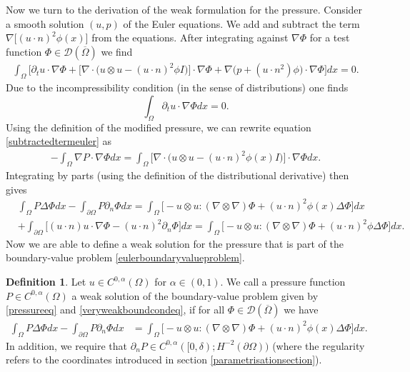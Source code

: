 \documentclass[12pt,a4paper]{article}
\theoremstyle{definition}
\newtheorem{definition}[theorem]{Definition}
\theoremstyle{remark}
\numberwithin{equation}{section}
\begin{document}
Now we turn to the derivation of the weak formulation for the pressure. Consider a smooth solution $(u,p)$ of the Euler equations. We add and subtract the term $\nabla \big[ (u \cdot n)^2 \phi (x) \big]$ from the equations. After integrating against $\nabla \Phi$ for a test function $\Phi \in \mathcal{D} (\overline{\Omega})$ we find
\begin{align} \label{subtractedtermeuler}
\int_\Omega \bigg[ \partial_t u \cdot \nabla \Phi + \big[ \nabla \cdot \big(u \otimes u - (u \cdot n)^2 \phi I \big) \big] \cdot \nabla \Phi + \nabla \big( p + (u \cdot n^2) \phi) \cdot \nabla \Phi \bigg] dx = 0.
\end{align}
Due to the incompressibility condition (in the sense of distributions) one finds
\begin{equation*}
\int_\Omega \partial_t u \cdot \nabla \Phi dx = 0.
\end{equation*}
Using the definition of the modified pressure, we can rewrite equation \eqref{subtractedtermeuler} as
\begin{align} \label{H1formulation}
- \int_\Omega \nabla P \cdot \nabla \Phi dx = \int_\Omega \big[ \nabla \cdot \big(u \otimes u - (u \cdot n)^2 \phi (x) I \big) \big] \cdot \nabla \Phi dx.
\end{align}
Integrating by parts (using the definition of the distributional derivative) then gives
\begin{align*} 
&\int_\Omega P \Delta \Phi dx - \int_{\partial \Omega} P \partial_n \Phi dx = \int_\Omega \bigg[ - u \otimes u : (\nabla \otimes \nabla) \Phi + (u \cdot n)^2 \phi (x) \Delta \Phi \bigg] dx \\
&+ \int_{\partial \Omega} \bigg[ (u \cdot n) u \cdot \nabla \Phi  - (u \cdot n)^2 \partial_n \Phi \bigg] dx = \int_\Omega \bigg[ - u \otimes u : (\nabla \otimes \nabla) \Phi + (u \cdot n)^2 \phi \Delta \Phi \bigg] dx.
\end{align*}
Now we are able to define a weak solution for the pressure that is part of the boundary-value problem \eqref{eulerboundaryvalueproblem}.
\begin{definition} \label{weakformulationdef}
Let $u \in C^{0,\alpha} (\Omega)$ for $\alpha \in (0,1)$. We call a pressure function $P \in C^{0,\alpha} (\Omega)$ a weak solution of the boundary-value problem given by \eqref{pressureeq} and \eqref{veryweakboundcondeq}, if for all $\Phi \in \mathcal{D} (\overline{\Omega})$ we have
\begin{align*} 
\int_\Omega P \Delta \Phi dx - \int_{\partial \Omega} P \partial_n \Phi dx  &= \int_\Omega \bigg[ - u \otimes u : (\nabla \otimes \nabla) \Phi + (u \cdot n)^2 \phi (x) \Delta \Phi \bigg] dx.
\end{align*}
In addition, we require that $\partial_n P \in C^{0,\alpha} ([0,\delta) ; H^{-2} (\partial \Omega) )$ (where the regularity refers to the coordinates introduced in section \ref{parametrisationsection}).
\end{definition}
\end{document}

